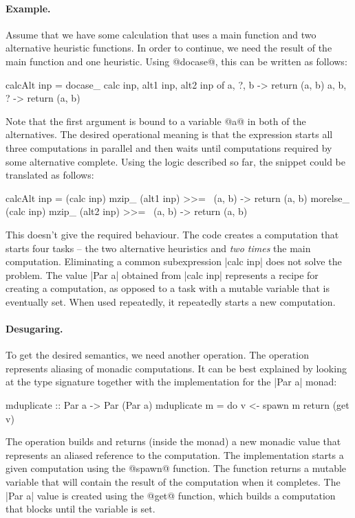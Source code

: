 \documentclass[preprint]{sigplanconf}
\begin{document}
\paragraph{Example.} Assume that we have some calculation that uses a main function and two alternative
heuristic functions. In order to continue, we need the result of the main function and one heuristic.
Using @docase@, this can be written as follows:

\begin{code}
calcAlt inp = docase_ calc inp, alt1 inp, alt2 inp of
  a, ?, b -> return (a, b)
  a, b, ? -> return (a, b)
\end{code}
Note that the first argument is bound to a variable @a@ in both of the alternatives. The desired 
operational meaning is that the expression starts all three computations in parallel and then waits 
until computations required by some alternative complete. Using the logic described so far, the 
snippet could be translated as follows:

\begin{code}
calcAlt inp = 
  (calc inp) mzip_ (alt1 inp) >>= \ (a, b) -> return (a, b) morelse_
  (calc inp) mzip_ (alt2 inp) >>= \ (a, b) -> return (a, b)
\end{code}
This doesn't give the required behaviour. The code creates a computation that 
starts four tasks -- the two alternative heuristics and \textit{two times} the main
computation. Eliminating a common subexpression |calc inp| does not solve the problem. The value 
|Par a| obtained from |calc inp| represents a recipe for creating a computation, as opposed to 
a task with a mutable variable that is eventually set. When used repeatedly, it repeatedly 
starts a new computation.

\paragraph{Desugaring.} To get the desired semantics, we need another operation. The operation
represents aliasing of monadic computations. It can be best explained by looking at the type 
signature together with the implementation for the |Par a| monad:

\begin{code}
mduplicate :: Par a -> Par (Par a)
mduplicate m = do 
  v <- spawn m
  return (get v)
\end{code}
The operation builds and returns (inside the monad) a new monadic value that represents 
an aliased reference to the computation. The implementation starts a given computation 
using the @spawn@ function. The function returns a mutable variable that will contain the result 
of the computation when it completes. The |Par a| value is created using the @get@ function,
which builds a computation that blocks until the variable is set.
\end{document}
